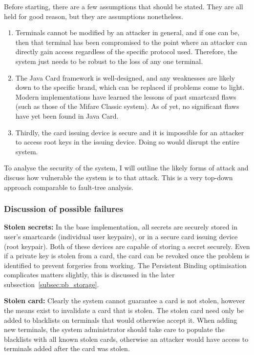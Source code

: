 \documentclass[12pt,a4paper]{article}
\begin{document}
Before starting, there are a few assumptions that should be stated. They are all held for good reason, but they are assumptions nonetheless.
\begin{enumerate}
	\item Terminals cannot be modified by an attacker in general, and if one can be, then that terminal has been compromised to the point where an attacker can directly gain access regardless of the specific protocol used. Therefore, the system just needs to be robust to the loss of any one terminal.
	
	\item The Java Card framework is well-designed, and any weaknesses are likely down to the specific brand, which can be replaced if problems come to light. Modern implementations have learned the lessons of past smartcard flaws (such as those of the Mifare Classic system). As of yet, no significant flaws have yet been found in Java Card.
	
	\item Thirdly, the card issuing device is secure and it is impossible for an attacker to access root keys in the issuing device. Doing so would disrupt the entire system.
\end{enumerate}

To analyse the security of the system, I will outline the likely forms of attack and discuss how vulnerable the system is to that attack. This is a very top-down approach comparable to fault-tree analysis.

\subsubsection{Discussion of possible failures} 

\textbf{Stolen secrets:} In the base implementation, all secrets are securely stored in user's smartcards (individual user keypairs), or in a secure card issuing device (root keypair). Both of these devices are capable of storing a secret securely. Even if a private key is stolen from a card, the card can be revoked once the problem is identified to prevent forgeries from working. The Persistent Binding optimisation complicates matters slightly, this is discussed in the later subsection~\ref{subsec:pb_storage}.

\textbf{Stolen card:} Clearly the system cannot guarantee a card is not stolen, however the means exist to invalidate a card that is stolen. The stolen card need only be added to blacklists on terminals that would otherwise accept it. When adding new terminals, the system administrator should take care to populate the blacklists with all known stolen cards, otherwise an attacker would have access to terminals added after the card was stolen.
\end{document}

